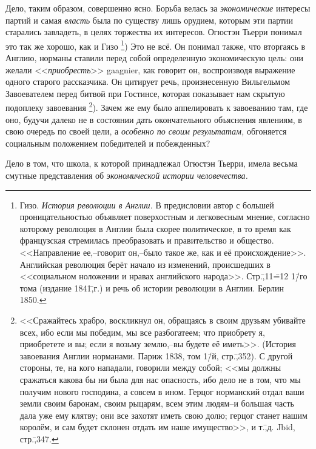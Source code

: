 Дело, таким образом, совершенно ясно. Борьба велась за \emph{экономические} интересы партий и самая \emph{власть} была по существу лишь орудием, которым эти партии старались завладеть, в целях торжества их интересов. Огюстэн Тьерри понимал это так же хорошо, как и Гизо \footnote{Гизо. \emph{История революции в Англии.} В предисловии автор с большей проницательностью объявляет поверхостным и легковесным мнение, согласно которому революция в Англии была скорее политическое, в то время как французская стремилась преобразовать и правительство и общество. <<Направление ее,\---говорит он,\---было такое же, как и её происхождение>>. Английская революция берёт начало из изменений, происшедших в <<социальном ноложении и нравах английского народа>>. Стр.\=,11\==12 1\=/го тома (издание 1841\=,г.) и речь об истории революции в Англии. Берлин 1850.}) Это не всё. Он понимал также, что вторгаясь в Англию, норманы ставили перед собой определенную экономическую цель: они желали <<\emph{приобресть}>> gaagnier, как говорит он, воспроизводя выражение одного старого рассказчика. Он цитирует речь, произнесенную Вильгельмом Завоевателем перед битвой при Гостинсе, которая показывает нам скрытую подоплеку завоевания \footnote{<<Сражайтесь храбро, воскликнул он, обращаясь в своим друзьям убивайте всех, ибо если мы победим, мы все разбогатеем; что приобрету я, приобретете и вы; если я возьму землю,\---вы будете её иметь>>. (История завоевания Англии норманами. Париж 1838, том 1\=/й, стр.\=,352). С другой стороны, те, на кого нападали, говорили между собой; <<мы должны сражаться какова бы ни была для нас опасность, ибо дело не в том, что мы получим нового господина, а совсем в ином. Герцог норманский отдал ваши земли своим баронам, своим рыцарям, всем этим людям\---и большая часть дала уже ему клятву; они все захотят иметь свою долю; герцог станет нашим королём, и сам будет склонен отдать им наше имущество>>, и т.\=,д. Jbid, стр.\=,347.}). Зачем же ему было аппелировать к завоеванию там, где оно, будучи далеко не в состоянии дать окончательного объяснения явлениям, в свою очередь по своей цели, а \emph{особенно по своим результатам,} обгоняется социальным положением победителей и побежденных?

Дело в том, что школа, к которой принадлежал Огюстэн Тьерри, имела весьма смутные представления об \emph{экономической истории человечества.}

